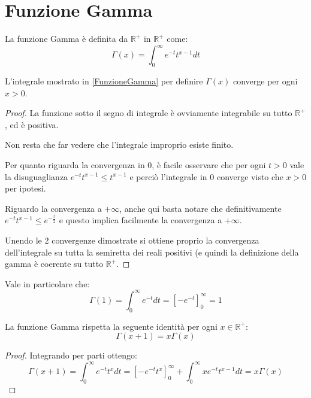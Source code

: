 \section{Funzione Gamma}

\begin{definition}\label{FunzioneGamma} 
	La funzione Gamma è definita da $\mathbb{R^+}$ in $\mathbb{R^+}$ come:
	\begin{equation*}
		\Gamma(x)=\int_0^{\infty}{e^{-t}t^{x-1}dt}
	\end{equation*}
\end{definition}

\begin{lemma}\label{GammaConverge}
	L'integrale mostrato in \cref{FunzioneGamma} per definire $\Gamma(x)$ converge per ogni $x>0$.
\end{lemma}
\begin{proof}
	La funzione sotto il segno di integrale è ovviamente integrabile su tutto $\mathbb{R^+}$, ed è positiva.
	
	Non resta che far vedere che l'integrale improprio esiste finito.
	
	Per quanto riguarda la convergenza in 0, è facile osservare che per ogni $t>0$ vale la disuguaglianza $e^{-t}t^{x-1}\le t^{x-1}$ 
	e perciò l'integrale in $0$ converge visto che $x>0$ per ipotesi.
	
	Riguardo la convergenza a $+\infty$, anche qui basta notare che definitivamente $e^{-t}t^{x-1}\le e^{-\frac t2}$
	e questo implica facilmente la convergenza a $+\infty$.
	
	Unendo le 2 convergenze dimostrate si ottiene proprio la convergenza dell'integrale su tutta la semiretta dei reali positivi (e quindi la 
	definizione della gamma è coerente su tutto $\mathbb{R^+}$.
\end{proof}


\begin{remark}\label{ValoreGamma1}
	Vale in particolare che:
	\begin{equation*}
		\Gamma(1)=\int_0^{\infty}{e^{-t}dt}=\left[-e^{-t}\right]_0^{\infty}=1
	\end{equation*}
\end{remark}


\begin{lemma}\label{FunzionaleGamma}
	La funzione Gamma rispetta la seguente identità per ogni $x\in\mathbb{R^+}$:
	\begin{equation*}
		\Gamma(x+1)=x\Gamma(x)
	\end{equation*}
\end{lemma}
\begin{proof}
	Integrando per parti ottengo:
	\begin{equation*} 
		\Gamma(x+1)=\int_0^{\infty}{e^{-t}t^xdt}=\left[-e^{-t}t^x\right]_0^{\infty}+\int_0^{\infty}xe^{-t}t^{x-1}dt=x\Gamma(x)
	\end{equation*}
\end{proof}


